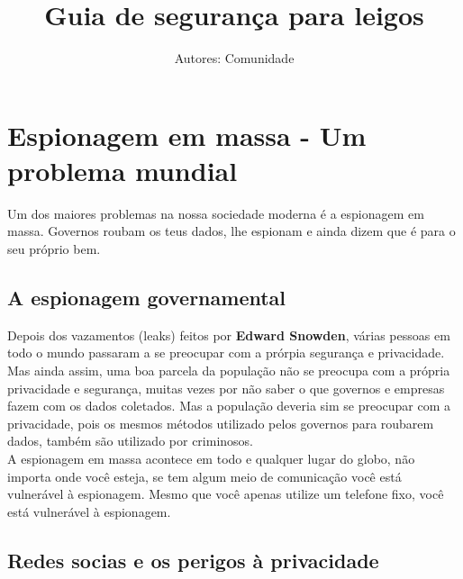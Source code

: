 \documentclass[12pt, letterpaper]{report}
\title{\Huge Guia de seguran\c{c}a para leigos} %
\author{Autores: Comunidade} %
\begin{document}
\maketitle %
\pagebreak %

\section*{Espionagem em massa - Um problema mundial} %

\large Um dos maiores problemas na nossa sociedade moderna é a espionagem em massa. Governos roubam os teus dados, lhe espionam e ainda dizem que é para o seu próprio bem.\\

\subsection{A espionagem governamental}

	Depois dos vazamentos (leaks) feitos por \textbf{Edward Snowden}, várias pessoas em todo o mundo passaram a se preocupar com a prórpia segurança e privacidade. Mas ainda assim, uma boa parcela da população não se preocupa com a própria privacidade e segurança, muitas vezes por não saber o que governos e empresas fazem com os dados coletados. Mas a população deveria sim se  preocupar com a privacidade, pois os mesmos métodos utilizado pelos governos para roubarem dados, também são utilizado por criminosos.\\

	A espionagem em massa acontece em todo e qualquer lugar do globo, não importa onde você esteja, se tem algum meio de comunicação você está vulnerável à espionagem. Mesmo que você apenas utilize um telefone fixo, você está vulnerável à espionagem.\\

\subsection{Redes socias e os perigos à privacidade}
\end{document}
